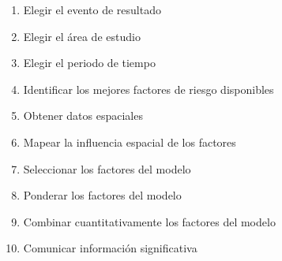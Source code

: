 \begin{enumerate}
    \item Elegir el evento de resultado
    \item Elegir el área de estudio
    \item Elegir el periodo de tiempo
    \item Identificar los mejores factores de riesgo disponibles
    \item Obtener datos espaciales
    \item Mapear la influencia espacial de los factores
    \item Seleccionar los factores del modelo
    \item Ponderar los factores del modelo
    \item Combinar cuantitativamente los factores del modelo
    \item Comunicar información significativa
\end{enumerate}